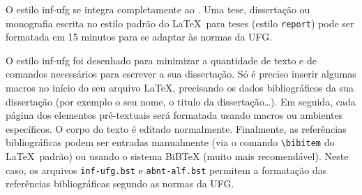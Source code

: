 O estilo \textsf{inf-ufg} se integra completamente ao \LaTeXe. Uma tese, dissertação ou monografia escrita no estilo padrão do \LaTeX\ para teses (estilo \verb|report|) pode ser formatada em 15 minutos para se adaptar às normas da UFG.

O estilo \textsf{inf-ufg} foi desenhado para minimizar a quantidade de texto e de comandos necessários para escrever a sua dissertação. Só é preciso inserir algumas macros no início do seu arquivo \LaTeX, precisando os dados bibliográficos da sua dissertação (por exemplo o seu nome, o titulo da dissertação\ldots). Em seguida, cada página dos elementos pré-textuais será formatada usando macros ou ambientes específicos. O corpo do texto é editado normalmente. Finalmente, as referências bibliográficas podem ser entradas manualmente (via o comando \verb|\bibitem| do \LaTeX\ padrão) ou usando o sistema BiBTeX (muito mais recomendável). Neste caso, os arquivos \verb|inf-ufg.bst| e \verb|abnt-alf.bst| permitem a formatação das referências bibliográficas segundo as normas da UFG.
